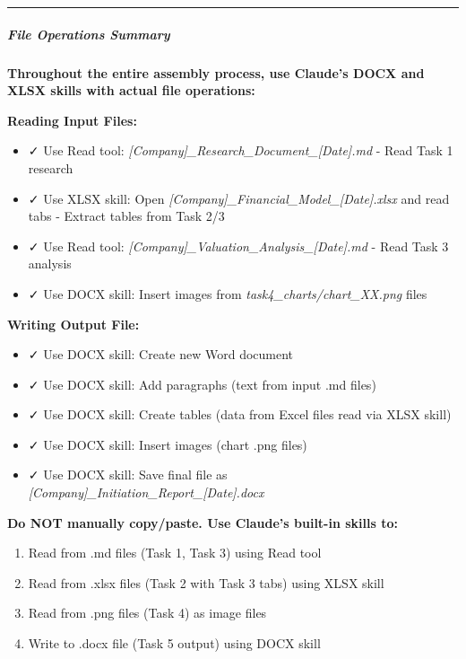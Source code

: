 \documentclass[11pt]{article}
\begin{document}
\vspace{0.5em}\hrule\vspace{0.5em}

\subparagraph{File Operations Summary}\mbox{}\par

\textbf{Throughout the entire assembly process, use Claude's DOCX and XLSX skills with actual file operations:}


\textbf{Reading Input Files:}

\begin{itemize}[leftmargin=*,itemsep=2pt,topsep=2pt]
\item {} ✓ Use Read tool: \emph{[Company]\_\allowbreak{}Research\_\allowbreak{}Document\_\allowbreak{}[Date].md} - Read Task 1 research
\item {} ✓ Use XLSX skill: Open \emph{[Company]\_\allowbreak{}Financial\_\allowbreak{}Model\_\allowbreak{}[Date].xlsx} and read tabs - Extract tables from Task 2/3
\item {} ✓ Use Read tool: \emph{[Company]\_\allowbreak{}Valuation\_\allowbreak{}Analysis\_\allowbreak{}[Date].md} - Read Task 3 analysis
\item {} ✓ Use DOCX skill: Insert images from \emph{task4\_\allowbreak{}charts/chart\_\allowbreak{}XX.png} files
\end{itemize}

\textbf{Writing Output File:}

\begin{itemize}[leftmargin=*,itemsep=2pt,topsep=2pt]
\item {} ✓ Use DOCX skill: Create new Word document
\item {} ✓ Use DOCX skill: Add paragraphs (text from input .md files)
\item {} ✓ Use DOCX skill: Create tables (data from Excel files read via XLSX skill)
\item {} ✓ Use DOCX skill: Insert images (chart .png files)
\item {} ✓ Use DOCX skill: Save final file as \emph{[Company]\_\allowbreak{}Initiation\_\allowbreak{}Report\_\allowbreak{}[Date].docx}
\end{itemize}

\textbf{Do NOT manually copy/paste. Use Claude's built-in skills to:}

\begin{enumerate}[leftmargin=*,itemsep=2pt,topsep=2pt]
\item {} Read from .md files (Task 1, Task 3) using Read tool
\item {} Read from .xlsx files (Task 2 with Task 3 tabs) using XLSX skill
\item {} Read from .png files (Task 4) as image files
\item {} Write to .docx file (Task 5 output) using DOCX skill
\end{enumerate}
\end{document}

